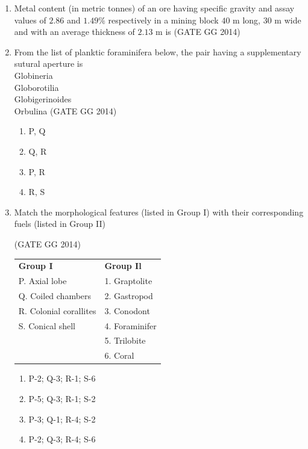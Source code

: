 \documentclass[journal]{IEEEtran}
\begin{document}
\begin{enumerate}[start=1]
\item Metal content (in metric tonnes) of an ore having specific gravity and assay values of $2.86$ and $1.49\%$ respectively in a mining block $40$ m long, $30$ m wide and with an average thickness of $2.13$ m is\underline{\hspace{1.5cm}} 
\hfill(GATE GG 2014)
\vspace{0.5cm}
\item From the list of planktic foraminifera below, the pair having a supplementary sutural aperture is\\
Globineria\\
Globorotilia\\
Globigerinoides\\
Orbulina
\hfill(GATE GG 2014)
\begin{multicols}{2}
\begin{enumerate}
    \item P, Q
    \item Q, R
    \item P, R
    \item R, S
\end{enumerate}
\end{multicols}

\item Match the morphological features (listed in Group I) with their corresponding fuels (listed in Group II) 

\hfill{(GATE GG 2014)}\\
\begin{tabular}{ l l }
\textbf{Group I} & \textbf{Group Il}\\
P. Axial lobe & 1. Graptolite \\
Q. Coiled chambers & 2. Gastropod \\
R. Colonial corallites & 3. Conodont \\
S. Conical shell & 4. Foraminifer \\
 & 5. Trilobite \\
 & 6. Coral \\
 \end{tabular}
 \begin{multicols}{2}
 \begin{enumerate}
\item P-2; Q-3; R-1; S-6 
\item  P-5; Q-3; R-1; S-2 
\item P-3; Q-1; R-4; S-2 
\item P-2; Q-3; R-4; S-6 
 \end{enumerate}
\end{multicols}


\end{enumerate}
\end{document}
